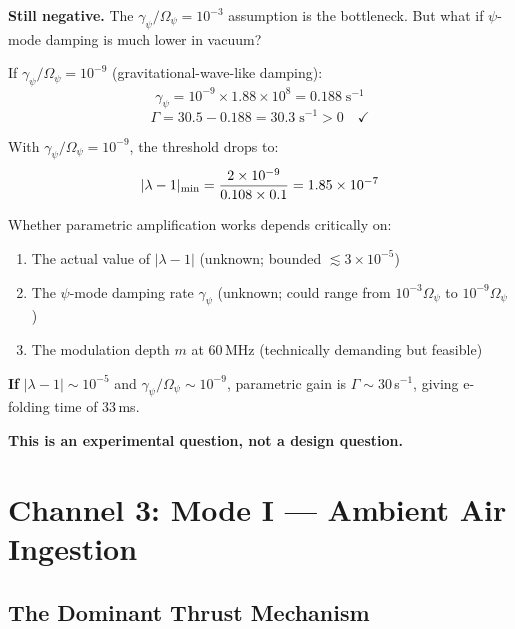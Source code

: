 \documentclass[12pt,letterpaper]{article}
\begin{document}
\textbf{Still negative.} The $\gamma_\psi/\Omega_\psi = 10^{-3}$ assumption is
the bottleneck. But what if $\psi$-mode damping is much lower in vacuum?

If $\gamma_\psi/\Omega_\psi = 10^{-9}$ (gravitational-wave-like damping):
\begin{equation}
\gamma_\psi = 10^{-9} \times 1.88 \times 10^8 = 0.188\;\text{s}^{-1}
\end{equation}
\begin{equation}
\Gamma = 30.5 - 0.188 = 30.3\;\text{s}^{-1} > 0 \quad \checkmark
\end{equation}

With $\gamma_\psi/\Omega_\psi = 10^{-9}$, the threshold drops to:
\begin{equation}
|\lambda - 1|_{\rm min} = \frac{2 \times 10^{-9}}{0.108 \times 0.1} = 1.85 \times 10^{-7}
\end{equation}

\begin{tcolorbox}[colback=blue!5!white, colframe=blue!50!black, title=Parametric Channel Assessment]
Whether parametric amplification works depends critically on:
\begin{enumerate}
\item The actual value of $|\lambda - 1|$ (unknown; bounded $\lesssim 3 \times 10^{-5}$)
\item The $\psi$-mode damping rate $\gamma_\psi$ (unknown; could range from
$10^{-3}\Omega_\psi$ to $10^{-9}\Omega_\psi$)
\item The modulation depth $m$ at 60\,MHz (technically demanding but feasible)
\end{enumerate}

\textbf{If} $|\lambda - 1| \sim 10^{-5}$ and $\gamma_\psi/\Omega_\psi \sim 10^{-9}$,
parametric gain is $\Gamma \sim 30$\,s$^{-1}$, giving e-folding time of 33\,ms.

\textbf{This is an experimental question, not a design question.}
\end{tcolorbox}

\section{Channel 3: Mode I --- Ambient Air Ingestion}
\label{sec:mode-I}

\subsection{The Dominant Thrust Mechanism}
\end{document}
